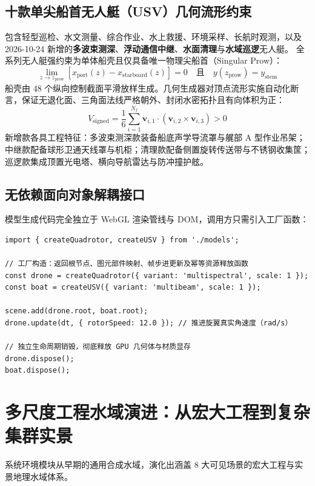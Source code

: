 \documentclass[UTF8,a4paper,11pt,fontset=fandol]{ctexart}
\begin{document}
\subsection{十款单尖船首无人艇（USV）几何流形约束}
包含轻型巡检、水文测量、综合作业、水上救援、环境采样、长航时观测，以及 2026-10-24 新增的\textbf{多波束测深}、\textbf{浮动通信中继}、\textbf{水面清理}与\textbf{水域巡逻}无人艇。
全系列无人艇强约束为单体船壳且仅具备唯一物理尖船首（Singular Prow）：
\begin{equation}
\lim_{z \to z_{\text{prow}}} \left[ x_{\text{port}}(z) - x_{\text{starboard}}(z) \right] = 0 \quad \text{且} \quad y(z_{\text{prow}}) = y_{\text{stem}}
\end{equation}
船壳由 48 个纵向控制截面平滑放样生成。几何生成器对顶点流形实施自动化断言，保证无退化面、三角面法线严格朝外、封闭水密拓扑且有向体积为正：
\begin{equation}
V_{\text{signed}} = \frac{1}{6} \sum_{i=1}^{N_f} \mathbf{v}_{i,1} \cdot (\mathbf{v}_{i,2} \times \mathbf{v}_{i,3}) > 0
\end{equation}
新增款各具工程特征：多波束测深款装备船底声学导流罩与艉部 A 型作业吊架；中继款配备球形卫通天线罩与机柜；清理款配备侧置旋转传送带与不锈钢收集筐；巡逻款集成顶置光电塔、横向导航雷达与防冲撞护舷。

\subsection{无依赖面向对象解耦接口}
模型生成代码完全独立于 WebGL 渲染管线与 DOM，调用方只需引入工厂函数：
\begin{lstlisting}
import { createQuadrotor, createUSV } from './models';

// 工厂构造：返回根节点、图元部件映射、帧步进更新及幂等资源释放函数
const drone = createQuadrotor({ variant: 'multispectral', scale: 1 });
const boat = createUSV({ variant: 'multibeam', scale: 1 });

scene.add(drone.root, boat.root);
drone.update(dt, { rotorSpeed: 12.0 }); // 推进旋翼真实角速度（rad/s）

// 独立生命周期销毁，彻底释放 GPU 几何体与材质显存
drone.dispose();
boat.dispose();
\end{lstlisting}

\section{多尺度工程水域演进：从宏大工程到复杂集群实景}

系统环境模块从早期的通用合成水域，演化出涵盖 8 大可见场景的宏大工程与实景地理水域体系。
\end{document}
